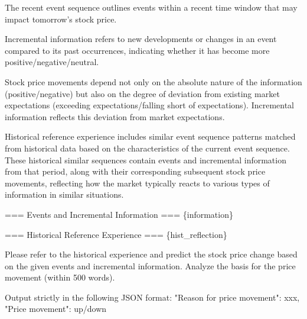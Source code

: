 \documentclass[sigconf, nonacm]{acmart} %
\begin{document}
The recent event sequence outlines events within a recent time window that may impact tomorrow's stock price.

Incremental information refers to new developments or changes in an event compared to its past occurrences, indicating whether it has become more positive/negative/neutral.

Stock price movements depend not only on the absolute nature of the information (positive/negative) but also on the degree of deviation from existing market expectations (exceeding expectations/falling short of expectations). Incremental information reflects this deviation from market expectations.

Historical reference experience includes similar event sequence patterns matched from historical data based on the characteristics of the current event sequence. These historical similar sequences contain events and incremental information from that period, along with their corresponding subsequent stock price movements, reflecting how the market typically reacts to various types of information in similar situations.

=== Events and Incremental Information ===
\{information\}

=== Historical Reference Experience ===
\{hist\_reflection\}

Please refer to the historical experience and predict the stock price change based on the given events and incremental information. Analyze the basis for the price movement (within 500 words). 

Output strictly in the following JSON format:
{{"Reason for price movement": xxx, "Price movement": up/down}}
\end{document}
